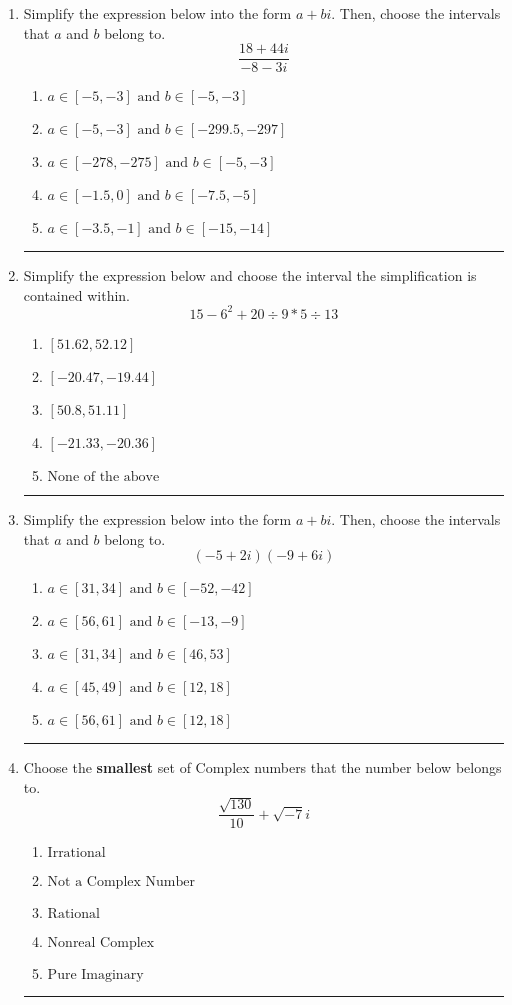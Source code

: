 \documentclass[14pt]{extbook}
\newcommand{\litem}[1]{\item#1\hspace*{-1cm}\rule{\textwidth}{0.4pt}}
\begin{document}
\begin{enumerate}
\litem{
Simplify the expression below into the form $a+bi$. Then, choose the intervals that $a$ and $b$ belong to.\[ \frac{18 + 44 i}{-8 - 3 i} \]\begin{enumerate}[label=\Alph*.]
\item \( a \in [-5, -3] \text{ and } b \in [-5, -3] \)
\item \( a \in [-5, -3] \text{ and } b \in [-299.5, -297] \)
\item \( a \in [-278, -275] \text{ and } b \in [-5, -3] \)
\item \( a \in [-1.5, 0] \text{ and } b \in [-7.5, -5] \)
\item \( a \in [-3.5, -1] \text{ and } b \in [-15, -14] \)

\end{enumerate} }
\litem{
Simplify the expression below and choose the interval the simplification is contained within.\[ 15 - 6^2 + 20 \div 9 * 5 \div 13 \]\begin{enumerate}[label=\Alph*.]
\item \( [51.62, 52.12] \)
\item \( [-20.47, -19.44] \)
\item \( [50.8, 51.11] \)
\item \( [-21.33, -20.36] \)
\item \( \text{None of the above} \)

\end{enumerate} }
\litem{
Simplify the expression below into the form $a+bi$. Then, choose the intervals that $a$ and $b$ belong to.\[ (-5 + 2 i)(-9 + 6 i) \]\begin{enumerate}[label=\Alph*.]
\item \( a \in [31, 34] \text{ and } b \in [-52, -42] \)
\item \( a \in [56, 61] \text{ and } b \in [-13, -9] \)
\item \( a \in [31, 34] \text{ and } b \in [46, 53] \)
\item \( a \in [45, 49] \text{ and } b \in [12, 18] \)
\item \( a \in [56, 61] \text{ and } b \in [12, 18] \)

\end{enumerate} }
\litem{
Choose the \textbf{smallest} set of Complex numbers that the number below belongs to.\[ \frac{\sqrt{130}}{10}+\sqrt{-7}i \]\begin{enumerate}[label=\Alph*.]
\item \( \text{Irrational} \)
\item \( \text{Not a Complex Number} \)
\item \( \text{Rational} \)
\item \( \text{Nonreal Complex} \)
\item \( \text{Pure Imaginary} \)


\end{enumerate}}
\end{enumerate}
\end{document}
